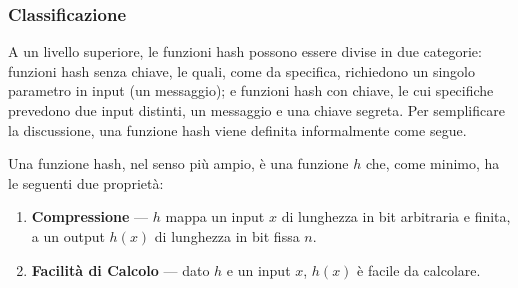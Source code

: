 \documentclass{article}
\theoremstyle{definition}
\begin{document}



\subsubsection{Classificazione}
A un livello superiore, le funzioni hash possono essere divise in due categorie: funzioni hash senza chiave, le quali, come da specifica, richiedono un singolo parametro in input (un messaggio); e funzioni hash con chiave, le cui specifiche prevedono due input distinti, un messaggio e una chiave segreta. Per semplificare la discussione, una funzione hash viene definita informalmente come segue.

Una funzione hash, nel senso più ampio, è una funzione \( h \) che, come minimo, ha le seguenti due proprietà:
\begin{enumerate}
    \item \textbf{Compressione} --- \( h \) mappa un input \( x \) di lunghezza in bit arbitraria e finita, a un output \( h(x) \) di lunghezza in bit fissa \( n \).
    \item \textbf{Facilità di Calcolo} --- dato \( h \) e un input \( x \), \( h(x) \) è facile da calcolare.
\end{enumerate}
\end{document}
